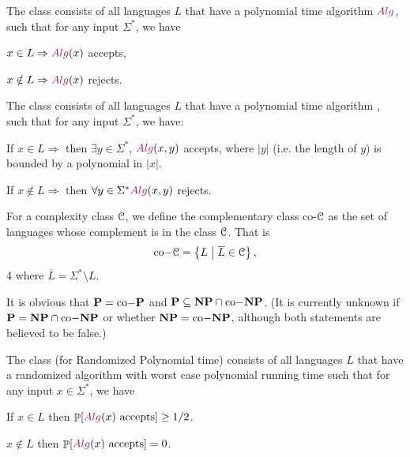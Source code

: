 \begin{defn}
    The class  consists of all languages $L$ that have a
    polynomial time algorithm $\Algorithm{Alg}$, such that for any
    input $\Sigma^{*}$, we have
    \begin{compactenumA}
        \item $x \in L \Rightarrow \Algorithm{Alg}(x)$ accepts,
        \item $x \notin L \Rightarrow \Algorithm{Alg}(x)$ rejects.
    \end{compactenumA}
\end{defn}

\begin{defn}
    The class  consists of all languages $L$ that have a
    polynomial time algorithm \Alg, such that for any input
    $\Sigma^{*}$,  we have:
    \begin{compactenumi}
        \item If $x \in L \Rightarrow$ then $\exists y \in \Sigma^*$,
        $\Alg(x,y)$ accepts, where $|y|$ (i.e. the length of $y$) is
        bounded by a polynomial in $|x|$.
     
        \item If $x \notin L \Rightarrow$ then $ \forall y \in
        \Sigma^* \Alg(x,y)$ rejects.
    \end{compactenumi}
\end{defn}

\begin{defn}
    For a complexity class $\EuScript{C}$, we define the complementary
    class co-$\EuScript{C}$ as the set of languages whose complement
    is in the class $\EuScript{C}$. That is 
    \begin{equation*}
        \mathrm{co-}\mathbf{\EuScript{C}} = \left\{ L \;\middle\vert\; \bigl.\smash{\overline{L}} \in \EuScript{C} \right\},
    \end{equation*}4
    where $\overline{L} = \Sigma^* \setminus L$.
\end{defn}

It is obvious that $\mathbf{P} = \mathrm{co-}\mathbf{P}$ and $\mathbf{P}
\subseteq \mathbf{NP} \cap \mathrm{co-}\mathbf{NP}$. (It is currently unknown if
$\mathbf{P} = \mathbf{NP} \cap \mathrm{co-}\mathbf{NP}$ or whether
$\mathbf{NP}=\mathrm{co-}\mathbf{NP}$, although both statements are believed to be
false.)

\begin{defn}
    The class  (for Randomized Polynomial time) consists of
    all languages $L$ that have a randomized algorithm \Alg with worst
    case polynomial running time such that for any input $x \in
    \Sigma^*$, we have
    \begin{compactenumi}
        \item If $x \in L$ then $\Prob{\Alg(x) \text{
              accepts}} \geq 1/2$.
     
        \item $x \notin L$ then $\Prob{\Alg(x) \text{
              accepts}} = 0 $.
    \end{compactenumi}
\end{defn}

